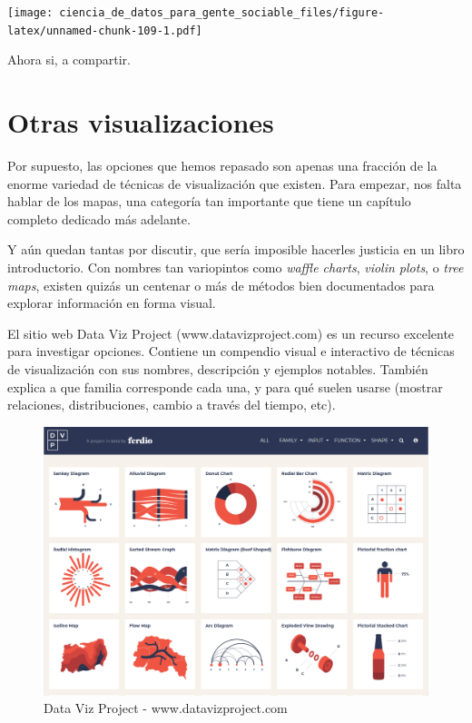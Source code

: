 \documentclass[]{book}
\begin{document}
\texttt{[image: ciencia\_de\_datos\_para\_gente\_sociable\_files/figure-latex/unnamed-chunk-109-1.pdf]}

Ahora si, a compartir.

\section{Otras visualizaciones}\label{otras-visualizaciones}

Por supuesto, las opciones que hemos repasado son apenas una fracción de
la enorme variedad de técnicas de visualización que existen. Para
empezar, nos falta hablar de los mapas, una categoría tan importante que
tiene un capítulo completo dedicado más adelante.

Y aún quedan tantas por discutir, que sería imposible hacerles justicia
en un libro introductorio. Con nombres tan variopintos como \emph{waffle
charts}, \emph{violin plots}, o \emph{tree maps}, existen quizás un
centenar o más de métodos bien documentados para explorar información en
forma visual.

El sitio web Data Viz Project (www.datavizproject.com) es un recurso
excelente para investigar opciones. Contiene un compendio visual e
interactivo de técnicas de visualización con sus nombres, descripción y
ejemplos notables. También explica a que familia corresponde cada una, y
para qué suelen usarse (mostrar relaciones, distribuciones, cambio a
través del tiempo, etc).

\begin{figure}
\includegraphics[width=8.64in]{imagenes/data_viz_project} \caption{Data Viz Project - www.datavizproject.com}\label{fig:unnamed-chunk-110}
\end{figure}
\end{document}
